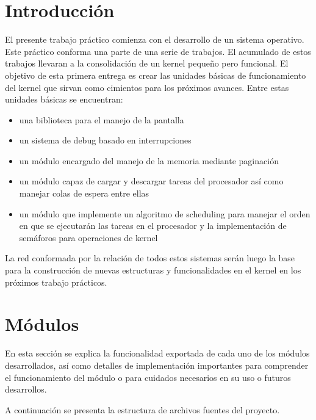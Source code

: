 \documentclass[a4paper]{article}
\begin{document}
\maketitle
\tableofcontents
\newpage

\section{Introducción}
El presente trabajo práctico comienza con el desarrollo de un sistema operativo. Este práctico conforma una parte de una serie de trabajos. El acumulado de estos trabajos llevaran a la consolidación de un kernel pequeño pero funcional. El objetivo de esta primera entrega es crear las unidades básicas de funcionamiento del kernel que sirvan como cimientos para los próximos avances. Entre estas unidades básicas se encuentran: 

\begin{itemize}
  \item una biblioteca para el manejo de la pantalla
  \item un sistema de debug basado en interrupciones
  \item un módulo encargado del manejo de la memoria mediante paginación
  \item un módulo capaz de cargar y descargar tareas del procesador así como manejar colas de espera entre ellas
  \item un módulo que implemente un algoritmo de scheduling para manejar el orden en que se ejecutarán las tareas en el procesador y la implementación de semáforos para operaciones de kernel
\end{itemize}

La red conformada por la relación de todos estos sistemas serán luego la base para la construcción de nuevas estructuras y funcionalidades en el kernel en los próximos trabajo prácticos. 

\newpage

\section{Módulos}

En esta sección se explica la funcionalidad exportada de cada uno de los módulos desarrollados, así como detalles de implementación importantes para comprender el funcionamiento del módulo o para cuidados necesarios en su uso o futuros desarrollos. 

A continuación se presenta la estructura de archivos fuentes del proyecto.
\end{document}
